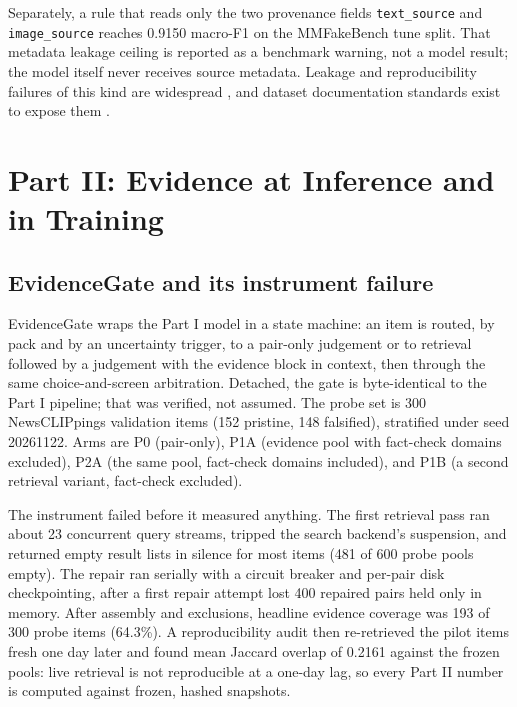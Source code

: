 \documentclass[conference]{IEEEtran}
\begin{document}
Separately, a rule that reads only the two provenance fields \texttt{text\_source} and \texttt{image\_source} reaches 0.9150 macro-F1 on the MMFakeBench tune split. That metadata leakage ceiling is reported as a benchmark warning, not a model result; the model itself never receives source metadata. Leakage and reproducibility failures of this kind are widespread \cite{Gururangan2018AnnotationArtifacts,Kapoor2023LeakageReproducibility,Pineau2020ImprovingReproducibility}, and dataset documentation standards exist to expose them \cite{Gebru2018DatasheetsDatasets}.

\section{Part II: Evidence at Inference and in Training}
\label{sec:part2}

\subsection{EvidenceGate and its instrument failure}

EvidenceGate wraps the Part I model in a state machine: an item is routed, by pack and by an uncertainty trigger, to a pair-only judgement or to retrieval followed by a judgement with the evidence block in context, then through the same choice-and-screen arbitration. Detached, the gate is byte-identical to the Part I pipeline; that was verified, not assumed. The probe set is 300 NewsCLIPpings validation items (152 pristine, 148 falsified), stratified under seed 20261122. Arms are P0 (pair-only), P1A (evidence pool with fact-check domains excluded), P2A (the same pool, fact-check domains included), and P1B (a second retrieval variant, fact-check excluded).

The instrument failed before it measured anything. The first retrieval pass ran about 23 concurrent query streams, tripped the search backend's suspension, and returned empty result lists in silence for most items (481 of 600 probe pools empty). The repair ran serially with a circuit breaker and per-pair disk checkpointing, after a first repair attempt lost 400 repaired pairs held only in memory. After assembly and exclusions, headline evidence coverage was 193 of 300 probe items (64.3\%). A reproducibility audit then re-retrieved the pilot items fresh one day later and found mean Jaccard overlap of 0.2161 against the frozen pools: live retrieval is not reproducible at a one-day lag, so every Part II number is computed against frozen, hashed snapshots.
\end{document}
